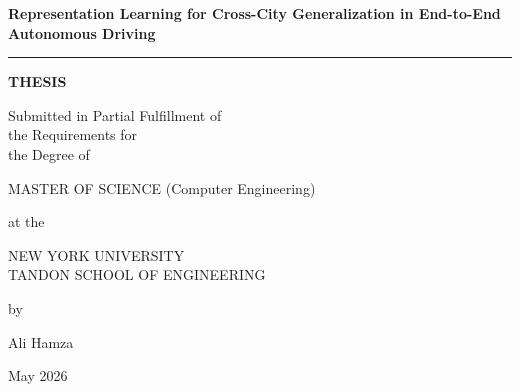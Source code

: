 \documentclass[12pt,letterpaper]{report}
\newcommand{\thesistitle}{Representation Learning for Cross-City Generalization in End-to-End Autonomous Driving}
\newcommand{\thesisauthor}{Ali Hamza}
\newcommand{\graddate}{May 2026}
\begin{document}

\hypersetup{pageanchor=false}
\thispagestyle{empty}
\begingroup
\singlespacing
\begin{center}
{\bfseries
  {\large\thesistitle}
  \vspace{0.35in}

  \rule{2.5in}{0.4pt}
  \vspace{0.35in}

 {\large {\bf THESIS}}\\
  \vspace{.35in}
  
  \begin{doublespace}
  {\large  
  Submitted in Partial Fulfillment of\\
  the Requirements for\\
  the Degree of\\}
  \end{doublespace}
  \vspace{.35in}
  
  {\large MASTER OF SCIENCE (Computer Engineering)}\\
  \vspace{.35in}

  at the \\
  \vspace{.15in}

  {\large
  NEW YORK UNIVERSITY\\
  \vspace{-0.05in}
  TANDON SCHOOL OF ENGINEERING\\
  }
  \vspace{.15in}

  by
  \vspace{.35in}

  {\large\thesisauthor}
  \vspace{.35in}

  {\large\graddate}
}

\end{center}
\endgroup

\newpage
\end{document}
